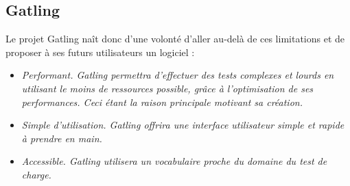 \subsection{Gatling}
Le projet Gatling naît donc d'une volonté d'aller au-delà de ces limitations et de proposer à ses futurs utilisateurs un logiciel :
\begin{itemize}
  \item \em{Performant}. Gatling permettra d'effectuer des tests complexes et lourds en utilisant le moins de ressources possible, grâce à l'optimisation de ses performances. Ceci étant la raison principale motivant sa création.
  \item \em{Simple d'utilisation}. Gatling offrira une interface utilisateur simple et rapide à prendre en main.
  \item \em{Accessible}. Gatling utilisera un vocabulaire proche du domaine du test de charge.
\end{itemize}